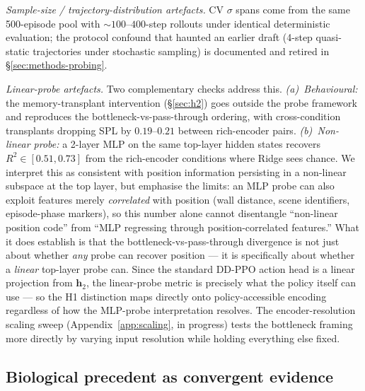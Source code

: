 \documentclass{article}
\begin{document}
\emph{Sample-size / trajectory-distribution artefacts.} CV $\sigma$ spans come from the same 500-episode pool with $\sim\!100$--$400$-step rollouts under identical deterministic evaluation; the protocol confound that haunted an earlier draft (4-step quasi-static trajectories under stochastic sampling) is documented and retired in §\ref{sec:methods-probing}.

\emph{Linear-probe artefacts.} Two complementary checks address this. \emph{(a)~Behavioural:} the memory-transplant intervention (§\ref{sec:h2}) goes outside the probe framework and reproduces the bottleneck-vs-pass-through ordering, with cross-condition transplants dropping SPL by $0.19$--$0.21$ between rich-encoder pairs. \emph{(b)~Non-linear probe:} a 2-layer MLP on the same top-layer hidden states recovers $R^2 \in [0.51, 0.73]$ from the rich-encoder conditions where Ridge sees chance. We interpret this as consistent with position information persisting in a non-linear subspace at the top layer, but emphasise the limits: an MLP probe can also exploit features merely \emph{correlated} with position (wall distance, scene identifiers, episode-phase markers), so this number alone cannot disentangle ``non-linear position code'' from ``MLP regressing through position-correlated features.'' What it does establish is that the bottleneck-vs-pass-through divergence is not just about whether \emph{any} probe can recover position --- it is specifically about whether a \emph{linear} top-layer probe can. Since the standard DD-PPO action head is a linear projection from $\mathbf{h}_2$, the linear-probe metric is precisely what the policy itself can use --- so the H1 distinction maps directly onto policy-accessible encoding regardless of how the MLP-probe interpretation resolves. The encoder-resolution scaling sweep (Appendix~\ref{app:scaling}, in progress) tests the bottleneck framing more directly by varying input resolution while holding everything else fixed.

\subsection{Biological precedent as convergent evidence}
\end{document}
